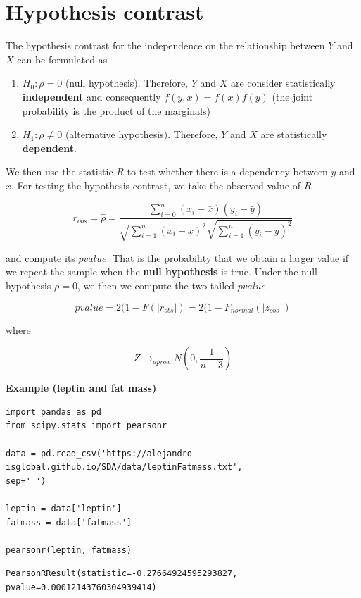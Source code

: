 \documentclass[
]{book}
\begin{document}
\hypertarget{hypothesis-contrast}{%
\section{Hypothesis contrast}\label{hypothesis-contrast}}

The hypothesis contrast for the independence on the relationship between \(Y\) and \(X\) can be formulated as

\begin{enumerate}
\def\labelenumi{\alph{enumi}.}
\item
  \(H_0: \rho=0\) (null hypothesis). Therefore, \(Y\) and \(X\) are consider statistically \textbf{independent} and consequently \(f(y,x)=f(x)f(y)\) (the joint probability is the product of the marginals)
\item
  \(H_1: \rho \neq 0\) (alternative hypothesis). Therefore, \(Y\) and \(X\) are statistically \textbf{dependent}.
\end{enumerate}

We then use the statistic \(R\) to test whether there is a dependency between \(y\) and \(x\). For testing the hypothesis contrast, we take the observed value of \(R\)

\[r_{obs}=\hat{\rho}=\frac{\sum_{i=0}^n(x_i-\bar{x})(y_i-\bar{y})}{\sqrt{\sum_{i=1}^n(x_i-\bar{x})^2}\sqrt{\sum_{i=1}^n(y_i-\bar{y})^2}}\]

and compute its \(pvalue\). That is the probability that we obtain a larger value if we repeat the sample when the \textbf{null hypothesis} is true. Under the null hypothesis \(\rho=0\), we then we compute the two-tailed \(pvalue\)

\[pvalue=2(1- F(|r_{obs}|)= 2(1- F_{normal}(|z_{obs}|)  \]

where

\[Z \rightarrow_{aprox} N(0, \frac{1}{n-3})\]

\textbf{Example (leptin and fat mass)}

\begin{verbatim}
import pandas as pd
from scipy.stats import pearsonr

data = pd.read_csv('https://alejandro-isglobal.github.io/SDA/data/leptinFatmass.txt', 
sep=' ')

leptin = data['leptin']
fatmass = data['fatmass']

pearsonr(leptin, fatmass)
\end{verbatim}

\begin{verbatim}
PearsonRResult(statistic=-0.27664924595293827, pvalue=0.00012143760304939414)
\end{verbatim}
\end{document}
